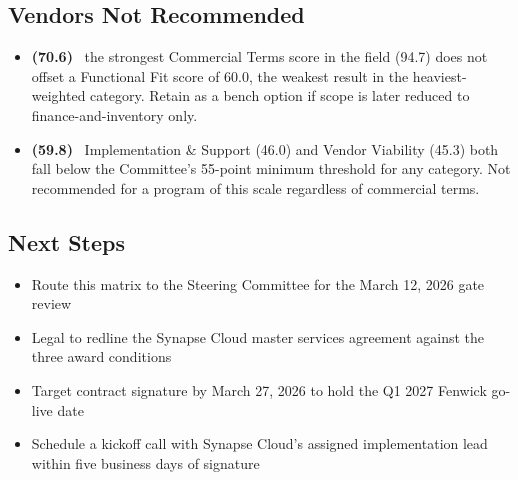 \begin{minipage}[t]{0.48\textwidth}
\subsection*{\color{primary}Vendors Not Recommended}
\begin{itemize}[leftmargin=1.4em, itemsep=3pt]
  \item \textbf{ (70.6)} \textemdash\ the strongest
    Commercial Terms score in the field (94.7) does not offset a Functional Fit score of 60.0,
    the weakest result in the heaviest-weighted category. Retain as a bench option if scope is
    later reduced to finance-and-inventory only.
  \item \textbf{ (59.8)} \textemdash\ Implementation
    \& Support (46.0) and Vendor Viability (45.3) both fall below the Committee's 55-point
    minimum threshold for any category. Not recommended for a program of this scale regardless
    of commercial terms.
\end{itemize}

\subsection*{\color{primary}Next Steps}
\begin{itemize}[leftmargin=1.4em, itemsep=3pt]
  \item[\faFile] Route this matrix to the Steering Committee for the March 12, 2026 gate review
  \item[\faPen] Legal to redline the Synapse Cloud master services agreement against the three
    award conditions
  \item[\faCalendar] Target contract signature by March 27, 2026 to hold the Q1 2027
    Fenwick go-live date
  \item[\faPhone] Schedule a kickoff call with Synapse Cloud's assigned implementation lead
    within five business days of signature
\end{itemize}
\end{minipage}

\vspace{8pt}
\par
{}
